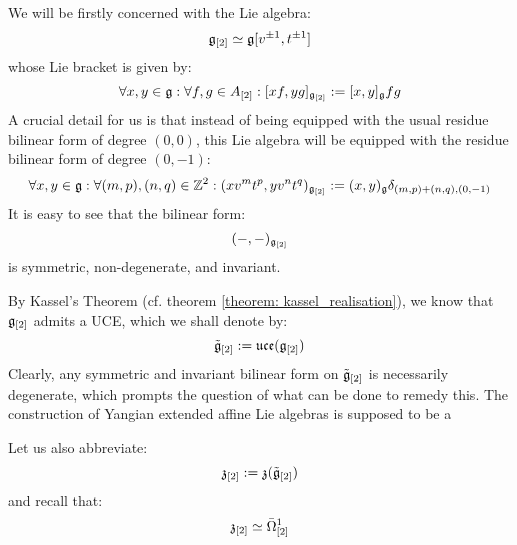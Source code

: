     We will be firstly concerned with the Lie algebra:
        $$\mathfrak{g}_{[2]} \simeq \mathfrak{g}[v^{\pm 1}, t^{\pm 1}]$$
    whose Lie bracket is given by:
        $$\forall x, y \in \mathfrak{g}: \forall f, g \in A_{[2]}: [x f, y g]_{\mathfrak{g}_{[2]}} := [x, y]_{\mathfrak{g}} fg$$
    A crucial detail for us is that instead of being equipped with the usual residue bilinear form of degree $(0, 0)$, this Lie algebra will be equipped with the residue bilinear form of degree $(0, -1)$:
        $$\forall x, y \in \mathfrak{g}: \forall (m, p), (n, q) \in \mathbb{Z}^2: (x v^m t^p, y v^n t^q)_{\mathfrak{g}_{[2]}} := (x, y)_{\mathfrak{g}} \delta_{(m, p) + (n, q), (0, -1)}$$
    It is easy to see that the bilinear form:
        $$(-, -)_{\mathfrak{g}_{[2]}}$$
    is symmetric, non-degenerate, and invariant. 

    By Kassel's Theorem (cf. theorem \ref{theorem: kassel_realisation}), we know that $\mathfrak{g}_{[2]}$ admits a UCE, which we shall denote by:
        $$\tilde{\mathfrak{g}}_{[2]} := \mathfrak{uce}(\mathfrak{g}_{[2]})$$
    Clearly, any symmetric and invariant bilinear form on $\tilde{\mathfrak{g}}_{[2]}$ is necessarily degenerate, which prompts the question of what can be done to remedy this. The construction of Yangian extended affine Lie algebras is supposed to be a 

    Let us also abbreviate:
        $$\mathfrak{z}_{[2]} := \mathfrak{z}(\tilde{\mathfrak{g}}_{[2]})$$
    and recall that:
        $$\mathfrak{z}_{[2]} \simeq \bar{\Omega}^1_{[2]}$$